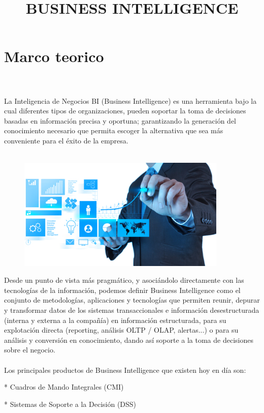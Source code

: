 \section{Marco teorico}
\title{BUSINESS INTELLIGENCE}\\\\
La Inteligencia de Negocios BI (Business Intelligence) es una herramienta bajo la cual diferentes tipos de organizaciones, pueden soportar la toma de decisiones basadas en información precisa y oportuna; garantizando la generación del conocimiento necesario que permita escoger la alternativa que sea más conveniente para el éxito de la empresa.\\\\
\begin{figure}[htb]
\begin{center}
\includegraphics[width=10cm]{./Imagenes/inegocios}
\end{center}
\end{figure}
Desde un punto de vista más pragmático, y asociándolo directamente con las tecnologías de la información, podemos definir Business Intelligence como el conjunto de metodologías, aplicaciones y tecnologías que permiten reunir, depurar y transformar datos de los sistemas transaccionales e información desestructurada (interna y externa a la compañía) en información estructurada, para su explotación directa (reporting, análisis OLTP / OLAP, alertas...) o para su análisis y conversión en conocimiento, dando así soporte a la toma de decisiones sobre el negocio.\\\\
Los principales productos de Business Intelligence que existen hoy en día son:

*  Cuadros de Mando Integrales (CMI)

*  Sistemas de Soporte a la Decisión (DSS)


